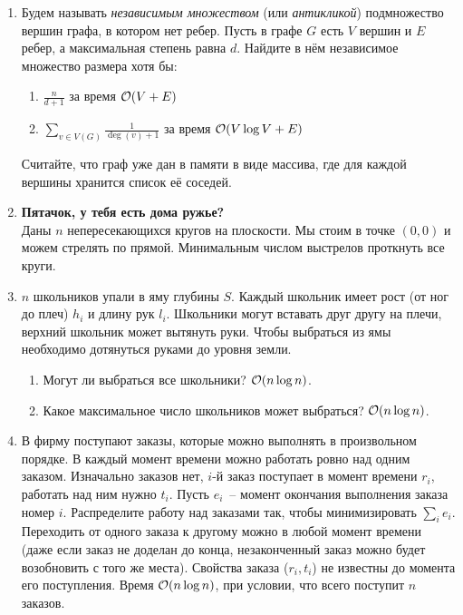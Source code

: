 \begin{enumerate}
\subsection*{Дополнительные задачи}

  \item
    Будем называть \textit{независимым множеством} (или \textit{антикликой}) подмножество вершин
    графа, в котором нет ребер. Пусть в графе $G$ есть $V$ вершин и $E$ ребер, а максимальная
    степень равна $d$. Найдите в нём независимое множество размера хотя бы:
	\begin{enumerate}
	  \item $\frac{n}{d+1}$ за время $\mathcal{O}(V + E)$
	  \item $\sum\limits_{v\in V(G)} \frac{1}{\deg(v)+1}$ за время $\mathcal{O}(V \log{V} + E)$
	\end{enumerate}
	Считайте, что граф уже дан в памяти в виде массива, где для каждой вершины хранится список её соседей.

  \item {\bf Пятачок, у тебя есть дома ружье?}\\
	Даны $n$ непересекающихся кругов на плоскости. Мы стоим в точке $(0,0)$ и можем стрелять по прямой.
	Минимальным числом выстрелов проткнуть все круги.

  \item
	$n$ школьников упали в яму глубины $S$. Каждый школьник имеет рост (от ног до плеч) $h_i$
	и длину рук $l_i$. Школьники могут вставать друг другу на плечи, верхний школьник может
	вытянуть руки. Чтобы выбраться из ямы необходимо дотянуться руками до уровня земли.
	\begin{enumerate}
		\item Могут ли выбраться все школьники? $\mathcal{O}(n \log n)$.
		\item Какое максимальное число школьников может выбраться? $\mathcal{O}(n \log n)$.
	\end{enumerate}

  \item
    В фирму поступают заказы, которые можно выполнять в произвольном
    порядке. В каждый момент времени можно работать ровно над одним
    заказом.  Изначально заказов нет, $i$-й заказ поступает в момент
    времени $r_i$, работать над ним нужно $t_i$. Пусть $e_i$~-- момент
    окончания выполнения заказа номер $i$. Распределите работу над
    заказами так, чтобы минимизировать $\sum_i e_i$. Переходить от
    одного заказа к другому можно в любой момент времени (даже если
    заказ не доделан до конца, незаконченный заказ можно будет
    возобновить с того же места).
    Свойства заказа ($r_i, t_i$) не известны до
    момента его поступления. Время $\mathcal{O}(n \log n)$, при условии, что
    всего поступит $n$ заказов.


\end{enumerate}
